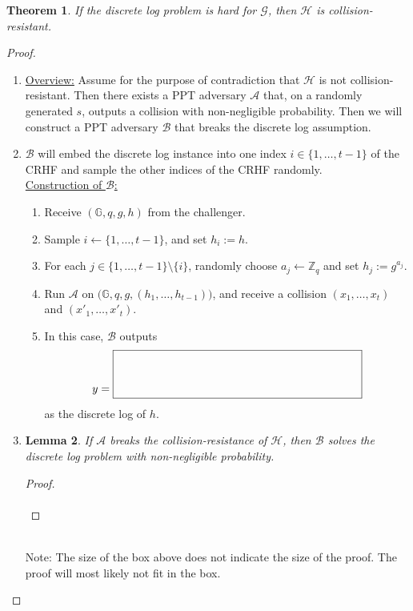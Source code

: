 \documentclass[11pt]{article}
\newcommand\custombox[2]{%
    \fbox{\rule{#1}{0pt}\rule[-0.5ex]{0pt}{#2}}}
\newtheorem{theorem}{Theorem}[section]
\newtheorem{lemma}[theorem]{Lemma}
\numberwithin{equation}{section}
\newcommand{\A}{\mathcal{A}}
\newcommand{\B}{\mathcal{B}}
\newcommand{\GG}{\mathbb{G}}
\newcommand{\ZZ}{\mathbb{Z}}
\begin{document}
\begin{theorem}\label{thm:dlog-implies-CRHF-security}
    If the discrete log problem is hard for $\mathcal{G}$, then $\mathcal{H}$ is collision-resistant.
\end{theorem}

\begin{proof}
\begin{enumerate}
    \item \underline{Overview:} Assume for the purpose of contradiction that $\mathcal{H}$ is not collision-resistant. Then there exists a PPT adversary $\A$ that, on a randomly generated $s$, outputs a collision with non-negligible probability. Then we will construct a PPT adversary $\B$ that breaks the discrete log assumption.
    \item $\B$ will embed the discrete log instance into one index $i \in \{1, \dots, t-1\}$ of the CRHF and sample the other indices of the CRHF randomly.\\
    
    \underline{Construction of $\B$:}
    \begin{enumerate}
        \item Receive $(\GG, q, g, h)$ from the challenger.
        \item Sample $i \gets \{1,\dots, t-1\}$, and set $h_i := h$.
        \item For each $j \in \{1,\dots, t-1\} \setminus\{i\}$, randomly choose $a_j \gets \ZZ_q$ and set $h_j := g^{a_j}$.
        \item Run $\A$ on $\big( \GG, q, g, (h_1,\dots, h_{t-1}) \big)$, and receive a collision $(x_1, \dots, x_t)$ and $(x'_1, \dots, x'_t)$.
        \item In this case, $\B$ outputs
        \[y = \custombox{3in}{.5in}\]
        as the discrete log of $h$.
    \end{enumerate}
    \item \begin{lemma}\label{thm:B-breaks-dlog}
        If $\A$ breaks the collision-resistance of $\mathcal{H}$, then $\B$ solves the discrete log problem with non-negligible probability.
    \end{lemma}
    \begin{proof}\\
    
        \custombox{5in}{.5in}\\
        
    \end{proof}\\
    Note: The size of the box above does not indicate the size of the proof. The proof will most likely not fit in the box.
\end{enumerate}
\end{proof}
\pagebreak
\end{document}
